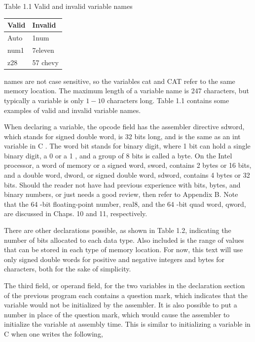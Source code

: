 \documentclass[10pt]{book}
\begin{document}
Table 1.1 Valid and invalid variable names

\begin{center}
\begin{tabular}{|l|l|}
\hline
Valid & Invalid \\
\hline
Auto & 1num \\
\hline
num1 & 7eleven \\
\hline
z28 & 57 chevy \\
\hline
\end{tabular}
\end{center}

names are not case sensitive, so the variables cat and CAT refer to the same memory location. The maximum length of a variable name is 247 characters, but typically a variable is only $1-10$ characters long. Table 1.1 contains some examples of valid and invalid variable names.

When declaring a variable, the opcode field has the assembler directive sdword, which stands for signed double word, is 32 bits long, and is the same as an int variable in C . The word bit stands for binary digit, where 1 bit can hold a single binary digit, a 0 or a 1 , and a group of 8 bits is called a byte. On the Intel processor, a word of memory or a signed word, sword, contains 2 bytes or 16 bits, and a double word, dword, or signed double word, sdword, contains 4 bytes or 32 bits. Should the reader not have had previous experience with bits, bytes, and binary numbers, or just needs a good review, then refer to Appendix B. Note that the 64 -bit floating-point number, real8, and the 64 -bit quad word, qword, are discussed in Chaps. 10 and 11, respectively.

There are other declarations possible, as shown in Table 1.2, indicating the number of bits allocated to each data type. Also included is the range of values that can be stored in each type of memory location. For now, this text will use only signed double words for positive and negative integers and bytes for characters, both for the sake of simplicity.

The third field, or operand field, for the two variables in the declaration section of the previous program each contains a question mark, which indicates that the variable would not be initialized by the assembler. It is also possible to put a number in place of the question mark, which would cause the assembler to initialize the variable at assembly time. This is similar to initializing a variable in C when one writes the following,
\end{document}
